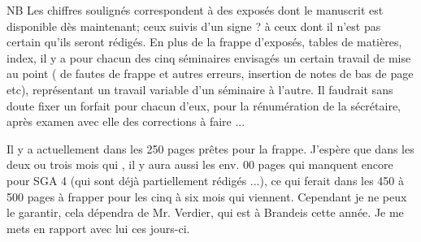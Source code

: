 
NB Les chiffres soulignés correspondent à des exposés dont le manuscrit est disponible dès maintenant; ceux suivis d'un signe ? à ceux dont il n'est pas certain qu'ils seront rédigés. En plus de la frappe d'exposés, tables de matières, index, il y a pour chacun des cinq séminaires envisagés un certain travail de mise au point ( de fautes de frappe et autres erreurs, insertion de notes de bas de page etc), représentant un travail variable d'un séminaire à l'autre. Il faudrait sans doute fixer un forfait pour chacun d'eux, pour la rénumération de la sécrétaire, après examen avec elle des corrections à faire ...

Il y a actuellement dans les 250 pages prêtes pour la frappe. J'espère que dans les deux ou trois mois qui , il y aura aussi les env. 00 pages qui manquent encore pour SGA 4 (qui sont déjà partiellement rédigés ...), ce qui ferait dans les 450 à 500 pages à frapper pour les cinq à six mois qui viennent. Cependant je ne peux le garantir, cela dépendra de Mr. Verdier, qui est à Brandeis cette année. Je me mets en rapport avec lui ces jours-ci.
